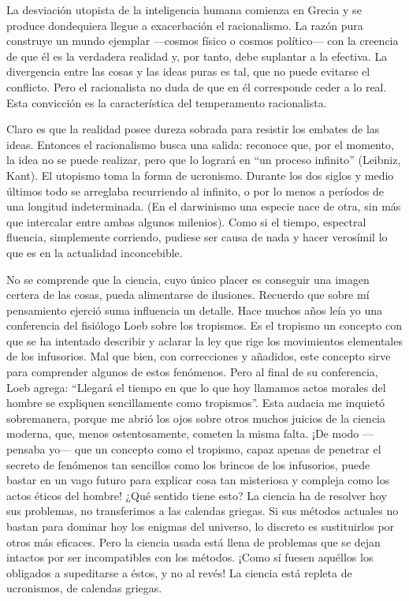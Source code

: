 \documentclass[a4paper, 12pt]{article}
\begin{document}
La desviación utopista de la inteligencia humana comienza en Grecia y se
produce dondequiera llegue a exacerbación el racionalismo. La razón pura
construye un mundo ejemplar ---cosmos físico o cosmos político--- con la
creencia de que él es la verdadera realidad y, por tanto, debe suplantar a
la efectiva. La divergencia entre las cosas y las ideas puras es tal, que
no puede evitarse el conflicto. Pero el racionalista no duda de que en él
corresponde ceder a lo real. Esta convicción es la característica del
temperamento racionalista.

Claro es que la realidad posee dureza sobrada para resistir los embates de
las ideas. Entonces el racionalismo busca una salida: reconoce que, por el
momento, la idea no se puede realizar, pero que lo logrará en ``un proceso
infinito''  (Leibniz, Kant). El utopismo toma la forma de ucronismo. Durante
los dos siglos y medio últimos todo se arreglaba recurriendo al infinito,
o por lo menos a períodos de una longitud indeterminada. (En el darwinismo
una especie nace de otra, sin más que intercalar entre ambas algunos
milenios). Como si el tiempo, espectral fluencia, simplemente corriendo,
pudiese ser causa de nada y hacer verosímil lo que es en la actualidad
inconcebible.

No se comprende que la ciencia, cuyo único placer es conseguir una imagen
certera de las cosas, pueda alimentarse de ilusiones. Recuerdo que sobre
mí pensamiento ejerció suma influencia un detalle. Hace muchos años leía
yo una conferencia del fisiólogo Loeb sobre los tropismos. Es el tropismo
un concepto con que se ha intentado describir y aclarar la ley que rige
los movimientos elementales de los infusorios. Mal que bien, con
correcciones y añadidos, este concepto sirve para comprender algunos de
estos fenómenos. Pero al final de su conferencia, Loeb agrega: ``Llegará el
tiempo en que lo que hoy llamamos actos morales del hombre se expliquen
sencillamente como tropismos''. Esta audacia me inquietó sobremanera, porque
me abrió los ojos sobre otros muchos juicios de la ciencia moderna, que,
menos ostentosamente, cometen la misma falta. ¡De modo ---pensaba yo--- que un
concepto como el tropismo, capaz apenas de penetrar el secreto de
fenómenos tan sencillos como los brincos de los infusorios, puede bastar
en un vago futuro para explicar cosa tan misteriosa y compleja como los
actos éticos del hombre! ¿Qué sentido tiene esto? La ciencia ha de
resolver hoy sus problemas, no transferimos a las calendas griegas. Si sus
métodos actuales no bastan para dominar hoy los enigmas del universo, lo
discreto es sustituirlos por otros más eficaces. Pero la ciencia usada
está llena de problemas que se dejan intactos por ser incompatibles con
los métodos. ¡Como sí fuesen aquéllos los obligados a supeditarse a éstos,
y no al revés! La ciencia está repleta de ucronismos, de calendas griegas.
\end{document}
